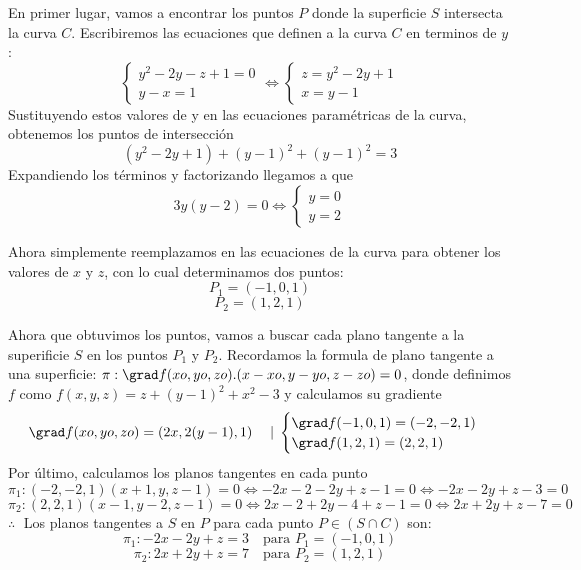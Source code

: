 \begin{solution}
En primer lugar, vamos a encontrar los puntos $P$ donde la superficie $S$ intersecta la curva $C$. Escribiremos las ecuaciones que definen a la curva $C $ en terminos de $y$:
   \[
   \begin{cases}
   y^2 - 2y - z + 1 = 0 \\
   y - x = 1
   \end{cases}
   \iff
   \begin{cases}
    z= y^2 - 2y  + 1 \\
    x =y- 1
   \end{cases}
  \]
Sustituyendo estos valores de y en las ecuaciones paramétricas de la curva, obtenemos los puntos de intersección
 \[
    (y^2 - 2y + 1) + (y - 1)^2 + (y - 1)^2 = 3
 \]
Expandiendo los términos y factorizando llegamos a que
 \[
    3y(y - 2) = 0 \iff 
    \begin{cases}
    y=0\\
    y=2
    \end{cases}
 \]

Ahora simplemente reemplazamos en las ecuaciones de la curva para obtener los valores de $x$ y $z$, con lo cual determinamos dos puntos:
\[
    P_1=(-1,0,1)
 \]
\[
    P_2=(1,2,1)
 \]
\end{solution}
Ahora que obtuvimos los puntos, vamos a buscar cada plano tangente a la superificie $S$ en los puntos $P_1 $ y $ P_2$. Recordamos la formula de plano tangente a una superficie: $\pi: \grad f(xo,yo,zo).(x-xo,y-yo,z-zo)=0$, donde definimos $f$ como $f(x,y,z)=z + (y - 1)^2 + x^2-3$ y calculamos su gradiente
\[
   \grad f(xo,yo,zo)=(2x,2(y-1),1)\quad\;|\; 
   \begin{cases}
   \grad f(-1,0,1)=(-2,-2,1)\\
   \grad f(1,2,1)=(2,2,1)
   \end{cases}
 \]
 Por último, calculamos los planos tangentes en cada punto
 \[
 \pi_1: (-2,-2,1)(x+1,y,z-1)=0 \iff -2x-2-2y+z-1=0\iff -2x-2y+z-3=0
 \]
 \[
 \pi_2: (2,2,1)(x-1,y-2,z-1)=0 \iff 2x-2+2y-4+z-1=0\iff 2x+2y+z-7=0
 \]
\newline
$\therefore\;$ Los planos tangentes a $S$ en $P$ para cada punto $P \in (S \cap C)$ son:
\[
\pi_1:-2x-2y+z=3\quad \text {para  }  P_1=(-1,0,1)
 \]
 \[
 \pi_2:2x+2y+z=7\quad \text {para  }  P_2=(1,2,1)
 \]



